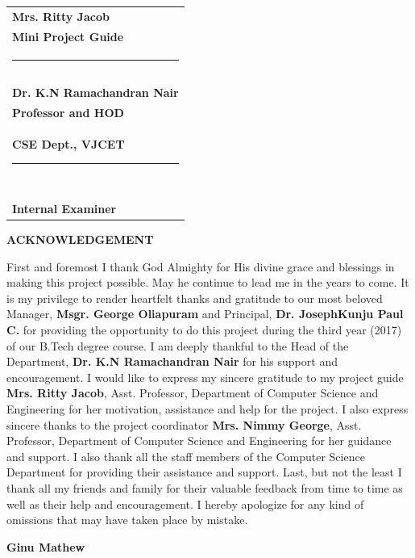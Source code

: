\documentclass[11pt]{report}
\begin{document}
\hfill
\begin{tabular}[t]{l@{}}
\textbf{Mrs. Ritty Jacob} \\
\textbf{Mini Project Guide}\\
\rule{1cm}{0cm}\\ \\ \\
\textbf{Dr. K.N Ramachandran Nair} \\
\textbf{Professor and HOD}\\
\textbf{CSE Dept., VJCET}
\rule{1cm}{0cm}\\ \\ \\ \\ \\ \\
\textbf{Internal Examiner}
\end{tabular}


\newpage
\thispagestyle{empty}
\begin{center}
\Large \textbf{ACKNOWLEDGEMENT}
\vspace{1cm}
\end{center}
First and foremost I thank God Almighty for His divine grace and blessings in making this project possible. May he continue to lead me in the years to come. It is my privilege to render heartfelt thanks and gratitude to our most beloved Manager, \textbf{Msgr. George Oliapuram} and Principal, \textbf{Dr. JosephKunju Paul C.} for providing the opportunity to do this project during the third year (2017) of our B.Tech degree course. I am deeply thankful to the Head of the Department, \textbf{Dr. K.N Ramachandran Nair} for his support and encouragement. I would like to express my sincere gratitude to my project guide \newline \textbf{ Mrs. Ritty Jacob}, Asst. Professor, Department of Computer Science and Engineering for her motivation, assistance and help for the project. I also express sincere thanks to the project coordinator \textbf{Mrs. Nimmy George}, Asst. Professor, Department of Computer Science and Engineering for her guidance and support. I also thank all the staff members of the Computer Science Department for providing their assistance and support. Last, but not the least I thank all my friends and family for their valuable feedback from time to time as well as their help and encouragement. I hereby apologize for any kind of omissions that may have taken place by mistake.

\vspace{3cm}
\begin{flushright}
\textbf{Ginu Mathew}
\end{flushright}
\end{document}
